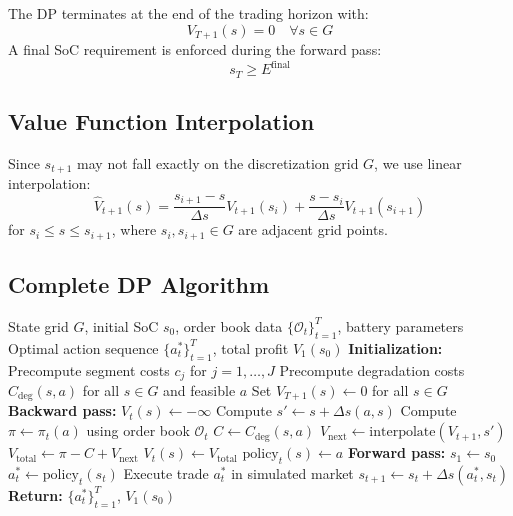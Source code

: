\documentclass[10pt,twocolumn]{article}
\begin{document}
The DP terminates at the end of the trading horizon with:
\[
V_{T+1}(s) = 0 \quad \forall s \in G
\]
A final SoC requirement is enforced during the forward pass:
\[
s_T \geq E^{\text{final}}
\]

\subsection{Value Function Interpolation}

Since $s_{t+1}$ may not fall exactly on the discretization grid $G$, we use linear interpolation:
\[
\hat{V}_{t+1}(s) = \frac{s_{i+1} - s}{\Delta s} V_{t+1}(s_i) + \frac{s - s_i}{\Delta s} V_{t+1}(s_{i+1})
\]
for $s_i \leq s \leq s_{i+1}$, where $s_i, s_{i+1} \in G$ are adjacent grid points.

\subsection{Complete DP Algorithm}

\begin{algorithm}[htb]
\caption{Health-Aware Rolling Intrinsic DP}
\label{alg:dp_health_aware}
\begin{algorithmic}[1]
\Require State grid $G$, initial SoC $s_0$, order book data $\{\mathcal{O}_t\}_{t=1}^T$, battery parameters
\Ensure Optimal action sequence $\{a_t^*\}_{t=1}^T$, total profit $V_1(s_0)$
\State \textbf{Initialization:}
\State Precompute segment costs $c_j$ for $j = 1, \ldots, J$
\State Precompute degradation costs $C_{\text{deg}}(s, a)$ for all $s \in G$ and feasible $a$
\State Set $V_{T+1}(s) \gets 0$ for all $s \in G$
\State \textbf{Backward pass:}
        \State $V_t(s) \gets -\infty$
            \State Compute $s' \gets s + \Delta s(a, s)$
            \State Compute $\pi \gets \pi_t(a)$ using order book $\mathcal{O}_t$
            \State $C \gets C_{\text{deg}}(s, a)$
            \State $V_{\text{next}} \gets \text{interpolate}(V_{t+1}, s')$
            \State $V_{\text{total}} \gets \pi - C + V_{\text{next}}$
                \State $V_t(s) \gets V_{\text{total}}$
                \State $\text{policy}_t(s) \gets a$
            \EndIf
        \EndFor
    \EndFor
\EndFor
\State \textbf{Forward pass:}
\State $s_1 \gets s_0$
    \State $a_t^* \gets \text{policy}_t(s_t)$
    \State Execute trade $a_t^*$ in simulated market
    \State $s_{t+1} \gets s_t + \Delta s(a_t^*, s_t)$
\EndFor
\State \textbf{Return:} $\{a_t^*\}_{t=1}^T$, $V_1(s_0)$
\end{algorithmic}
\end{algorithm}
\end{document}
